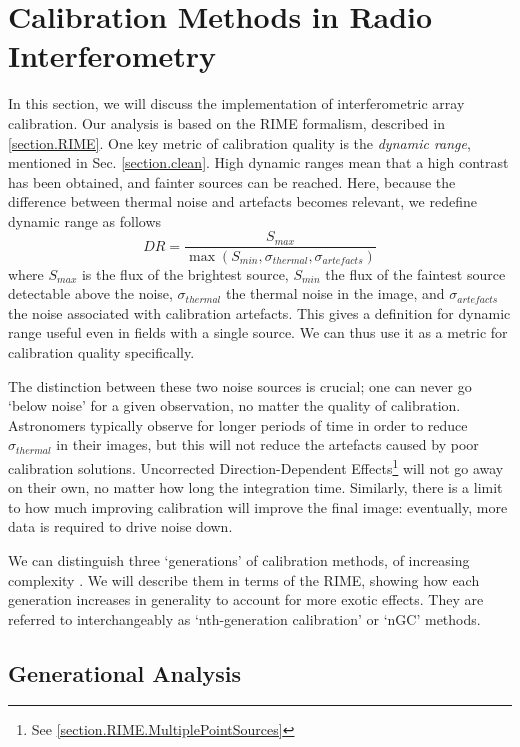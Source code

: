 
\section{Calibration Methods in Radio Interferometry}\label{section.calibration}
\pg
In this section, we will discuss the implementation of interferometric array calibration. Our analysis is based on the RIME formalism, described in \cref{section.RIME}. One key metric of calibration quality is the \emph{dynamic range}, mentioned in Sec. \ref{section.clean}. High dynamic ranges mean that a high contrast has been obtained, and fainter sources can be reached. Here, because the difference between thermal noise and artefacts becomes relevant, we redefine dynamic range as follows
\begin{equation}\label{eq.DR}
DR = \frac{S_{max}}{\max(S_{min},\sigma_{thermal},\sigma_{artefacts})}
\end{equation}
where $S_{max}$ is the flux of the brightest source, $S_{min}$ the flux of the faintest source detectable above the noise, $\sigma_{thermal}$ the thermal noise in the image, and $\sigma_{artefacts}$ the noise associated with calibration artefacts. This gives a definition for dynamic range useful even in fields with a single source. We can thus use it as a metric for calibration quality specifically.

\pg
The distinction between these two noise sources is crucial; one can never go `below noise' for a given observation, no matter the quality of calibration. Astronomers typically observe for longer periods of time in order to reduce $\sigma_{thermal}$ in their images, but this will not reduce the artefacts caused by poor calibration solutions. Uncorrected Direction-Dependent Effects\footnote{See \cref{section.RIME.MultiplePointSources}} will not go away on their own, no matter how long the integration time. Similarly, there is a limit to how much improving calibration will improve the final image: eventually, more data is required to drive noise down.

\pg
We can distinguish three `generations' of calibration methods, of increasing complexity . We will describe them in terms of the RIME, showing how each generation increases in generality to account for more exotic effects. They are referred to interchangeably as `nth-generation calibration' or `nGC' methods.

\subsection{Generational Analysis}

